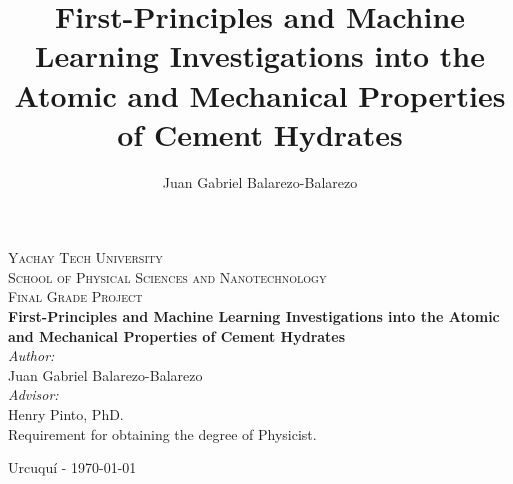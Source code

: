 \documentclass[11pt, titlepage, twoside, openright, usernames, dvipsnames]{thesis}
\title{First-Principles and Machine Learning Investigations into the Atomic and
       Mechanical Properties of Cement Hydrates}
\author{Juan Gabriel Balarezo-Balarezo}
\theoremstyle{definition}
\theoremstyle{definition}
\begin{document}
\begin{titlepage}
  \thispagestyle{fancy} %
  \fancyhf{} %

  
  \renewcommand{\headrulewidth}{0pt}

  \vspace*{2cm} %
  \begin{center}
    \textsc{\huge Yachay Tech University}\\
    \vspace*{1cm} %
    \textsc{\LARGE School of Physical Sciences and Nanotechnology}\\[1.5cm]
    \textsc{\LARGE Final Grade Project}\\[1cm]
    {\huge \bfseries First-Principles and Machine Learning Investigations into the Atomic and Mechanical Properties of Cement Hydrates}\\[2cm]
    {\large 
    \emph{Author:}\\ 
    Juan Gabriel Balarezo-Balarezo\\[1cm]

    \emph{Advisor:} \\
    Henry Pinto, PhD.\\[1cm]
    }
    Requirement for obtaining the degree of Physicist.
    \vspace{1cm}

    Urcuquí - \today
  \end{center}
\end{titlepage}
%
\end{document}
